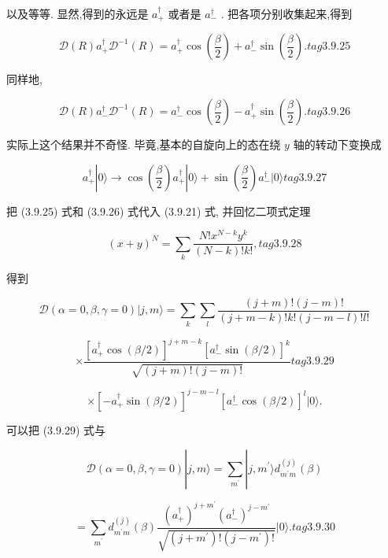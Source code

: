 以及等等. 显然,得到的永远是 ${a}_{ + }^{ \dagger }$ 或者是 ${a}_{ - }^{ \dagger }$ . 把各项分别收集起来,得到

$$
\mathcal{D}\left( R\right) {a}_{ + }^{ \dagger }{\mathcal{D}}^{-1}\left( R\right) = {a}_{ + }^{ \dagger }\cos \left( \frac{\beta }{2}\right) + {a}_{ - }^{ \dagger }\sin \left( \frac{\beta }{2}\right) . tag{3.9.25}
$$

同样地,

$$
\mathcal{D}\left( R\right) {a}_{ - }^{ \dagger }{\mathcal{D}}^{-1}\left( R\right) = {a}_{ - }^{ \dagger }\cos \left( \frac{\beta }{2}\right) - {a}_{ + }^{ \dagger }\sin \left( \frac{\beta }{2}\right) . tag{3.9.26}
$$

实际上这个结果并不奇怪. 毕竟,基本的自旋向上的态在绕 $y$ 轴的转动下变换成

$$
{a}_{ + }^{ \dagger }\left| {0\rangle \rightarrow \cos \left( \frac{\beta }{2}\right) {a}_{ + }^{ \dagger }}\right| 0\rangle + \sin \left( \frac{\beta }{2}\right) {a}_{ - }^{ \dagger }|0\rangle tag{3.9.27}
$$

把 (3.9.25) 式和 (3.9.26) 式代入 (3.9.21) 式, 并回忆二项式定理

$$
{\left( x + y\right) }^{N} = \mathop{\sum }\limits_{k}\frac{N!{x}^{N - k}{y}^{k}}{\left( {N - k}\right) !k!}, tag{3. 9.28}
$$

得到

$$
\mathcal{D}\left( {\alpha = 0,\beta ,\gamma = 0}\right) |j, m\rangle = \mathop{\sum }\limits_{k}\mathop{\sum }\limits_{l}\frac{\left( {j + m}\right) !\left( {j - m}\right) !}{\left( {j + m - k}\right) !k!\left( {j - m - l}\right) !l!}
$$

$$
\times \frac{{\left\lbrack {a}_{ + }^{ \dagger }\cos \left( \beta /2\right) \right\rbrack }^{j + m - k}{\left\lbrack {a}_{ - }^{ \dagger }\sin \left( \beta /2\right) \right\rbrack }^{k}}{\sqrt{\left( {j + m}\right) !\left( {j - m}\right) !}} tag{3.9.29}
$$

$$
\times {\left\lbrack -{a}_{ + }^{ \dagger }\sin \left( \beta /2\right) \right\rbrack }^{j - m - l}{\left\lbrack {a}_{ - }^{ \dagger }\cos \left( \beta /2\right) \right\rbrack }^{l}|0\rangle .
$$

可以把 (3.9.29) 式与

$$
\mathcal{D}\left( {\alpha = 0,\beta ,\gamma = 0}\right) \left| {j, m\rangle = \mathop{\sum }\limits_{{m}^{\prime }}}\right| j,{m}^{\prime }\rangle {d}_{{m}^{\prime }m}^{\left( j\right) }\left( \beta \right)
$$

$$
= \mathop{\sum }\limits_{{m}^{\prime }}{d}_{{m}^{\prime }m}^{\left( j\right) }\left( \beta \right) \frac{{\left( {a}_{ + }^{ \dagger }\right) }^{j + {m}^{\prime }}{\left( {a}_{ - }^{ \dagger }\right) }^{j - {m}^{\prime }}}{\sqrt{\left( {j + {m}^{\prime }}\right) !\left( {j - {m}^{\prime }}\right) !}}|0\rangle . tag{3.9.30}
$$

